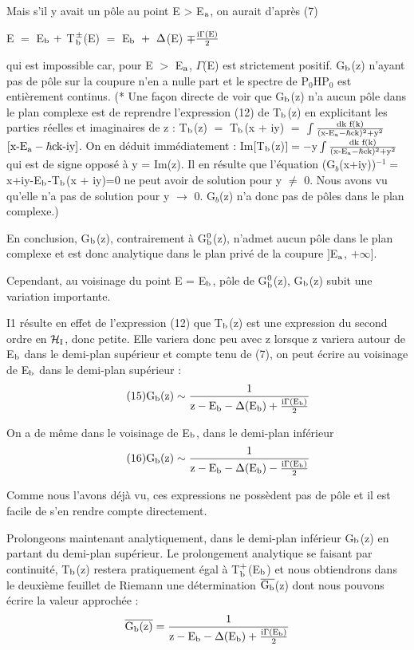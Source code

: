 Mais s'il y avait un pôle au point E > E$_{\text{a}}$, on aurait d'après (7)
\begin{center}
E $=$ E$_{\text{b}}\ +$ T$_{\text{b}}^\pm$(E) $=$ E$_{\text{b}}\ +\ \Delta$(E) $\mp\frac{\text{i}\Gamma\text{(E)}}{2}$
\end{center}
qui est impossible car, pour E $>$ E$_{\text{a}}$, $\Gamma$(E) est strictement positif.
G$_{\text{b}}$(z) n'ayant pas de pôle sur la coupure n'en a nulle part et le spectre
de P$_0$HP$_0$ est entièrement continus. (* Une façon directe de voir que G$_{\text{b}}$(z) n'a aucun pôle dans le plan complexe est de
reprendre l'expression (12) de T$_{\text{b}}$(z) en explicitant les parties réelles et imaginaires de z : 
T$_{\text{b}}$(z) $=$ T$_{\text{b}}$(x + iy) $=$
$\int\frac{\text{dk f(k)}}{(\text{x-E}_{\text{a}}-\hbar\text{ck})^2+\text{y}^2}$
$[\text{x-E}_{\text{a}}-\hbar\text{ck-iy}]$. 
On en déduit immédiatement : Im$[$T$_{\text{b}}$(z)$]=
-\text{y}\int\frac{\text{dk f(k)}}{(\text{x-E}_{\text{a}}-\hbar\text{ck})^2+\text{y}^2}$
qui est de signe opposé à y = Im(z).
Il en résulte que l'équation (G$_b$(x+iy))$^{-1}=$x+iy-E$_{\text{b}}$-T$_{\text{b}}$(x + iy)=0 ne peut avoir
de solution pour y $\neq$ 0. Nous avons vu qu'elle n'a pas de solution pour y $\to$ 0.
G$_b$(z) n'a donc pas de pôles dans le plan complexe.)

En conclusion, G$_{\text{b}}$(z), contrairement à G$^0_{\text{b}}$(z), n'admet aucun pôle
dans le plan complexe et est donc analytique dans le plan privé de la coupure
$]$E$_{\text{a}}$, $+\infty ]$.

Cependant, au voisinage du point E = E$_{\text{b}}$, pôle de G$^0_{\text{b}}$(z), G$_{\text{b}}$(z)
subit une variation importante.

I1 résulte en effet de l'expression (12) que T$_{\text{b}}$(z) est une expression du second ordre en $\mathcal{H}_{\text{I}}$, donc petite. Elle variera donc peu avec z
lorsque z variera autour de E$_{\text{b}}$ dans le demi-plan supérieur et compte tenu de
(7), on peut écrire au voisinage de E$_{\text{b}}$ dans le demi-plan supérieur :
\[
\tag{15}\text{G}_{\text{b}}\text{(z)}\sim\frac{1}{\text{z}-\text{E}_{\text{b}}-\Delta(\text{E}_{\text{b}})
+\frac{\text{i}\Gamma(\text{E}_{\text{b}})}{2}}
\]

On a de même dans le voisinage de E$_{\text{b}}$, dans le demi-plan inférieur
\[
\tag{16}\text{G}_{\text{b}}\text{(z)}\sim\frac{1}{\text{z}-\text{E}_{\text{b}}-\Delta(\text{E}_{\text{b}})
-\frac{\text{i}\Gamma(\text{E}_{\text{b}})}{2}}
\]

Comme nous l'avons déjà vu, ces expressions ne possèdent pas de
pôle et il est facile de s'en rendre compte directement.

Prolongeons maintenant analytiquement, dans le demi-plan inférieur G$_{\text{b}}$(z) en partant du demi-plan supérieur. Le prolongement analytique se
faisant par continuité, T$_{\text{b}}$(z) restera pratiquement égal à T$^+_{\text{b}}$(E$_{\text{b}}$) et nous
obtiendrons dans le deuxième feuillet de Riemann une détermination $\overline{\text{G}_{\text{b}}}$(z)
dont nous pouvons écrire la valeur approchée :
\[
\overline{\text{G}_{\text{b}}\text{(z)}}=\frac{1}{\text{z}-\text{E}_{\text{b}}-\Delta(\text{E}_{\text{b}})
+\frac{\text{i}\Gamma(\text{E}_{\text{b}})}{2}}
\]

